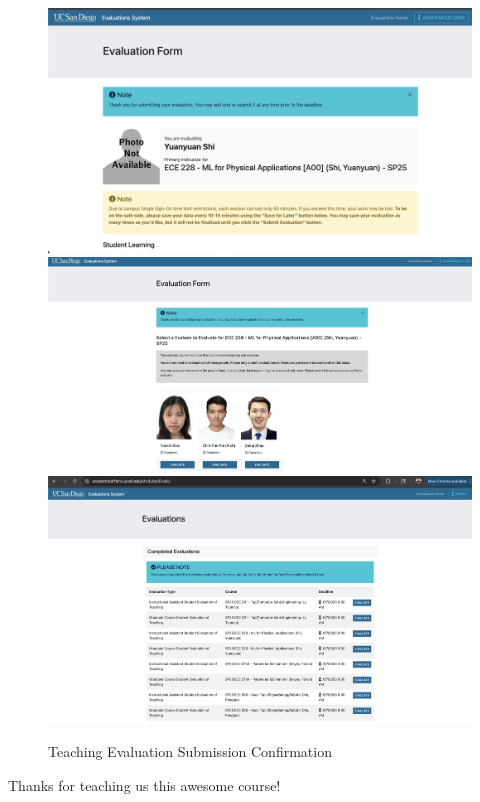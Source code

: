 \documentclass{article}
\begin{document}
\begin{figure}[H]
    \centering
    \includegraphics[width=0.49\linewidth]{figures/teaching_evaluations/instructor_eval.png}
    \includegraphics[width=0.49\linewidth]{figures/teaching_evaluations/ta_eval.png}
    \includegraphics[width=\linewidth]{figures/teaching_evaluations/set_eval.png}
    \caption{Teaching Evaluation Submission Confirmation}
    \label{fig:teaching_evaluation}
\end{figure}

Thanks for teaching us this awesome course!




\end{document}
